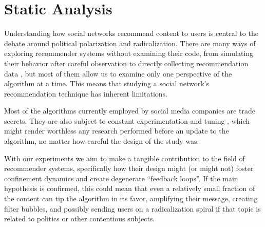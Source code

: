 





\chapter{Static Analysis}
\label{cap:static}

Understanding how social networks recommend content to users is central to the
debate around political polarization and radicalization. There are many ways of
exploring recommender systems without examining their code, from simulating
their behavior after careful observation \citep{yao_measuring_2021} to directly
collecting recommendation data \citep{ribeiro_auditing_2020}, but most of them
allow us to examine only one perspective of the algorithm at a time. This means
that studying a social network's recommendation technique has inherent
limitations.

Most of the algorithms currently employed by social media companies are trade
secrets. They are also subject to constant experimentation and tuning
\citep{noauthor_congratulations_2020}, which might render worthless any research
performed before an update to the algorithm, no matter how careful the design of
the study was.

With our experiments we aim to make a tangible contribution to the field of
recommender systems, specifically how their design might (or might not) foster
confinement dynamics and create degenerate ``feedback loops''. If the main
hypothesis is confirmed, this could mean that even a relatively small fraction
of the content can tip the algorithm in its favor, amplifying their message,
creating filter bubbles, and possibly sending users on a radicalization spiral
if that topic is related to politics or other contentious subjects.


